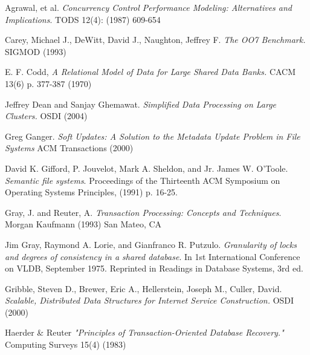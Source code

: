 \documentclass[10pt,letterpaper,twocolumn,english]{article}
\begin{document}
\begin{thebibliography}{99}
\begin{small}
 Agrawal, et al. {\em Concurrency
Control Performance Modeling: Alternatives and Implications}. TODS
12(4): (1987) 609-654



 Carey, Michael J., DeWitt, David J., Naughton, Jeffrey F. {\em The OO7 Benchmark.} SIGMOD (1993)

 E. F. Codd, {\em A Relational Model of Data for Large Shared Data Banks.} CACM 13(6) p. 377-387 (1970)

 Jeffrey Dean and Sanjay Ghemawat. {\em Simplified Data Processing on Large Clusters. } OSDI (2004)


 Greg Ganger.  {\em Soft Updates: A Solution to the Metadata Update Problem in File Systems } ACM Transactions (2000)

 David K. Gifford, P. Jouvelot, Mark A. Sheldon, and Jr. James W. O'Toole. {\em Semantic file systems}. Proceedings of the Thirteenth ACM Symposium on Operating Systems Principles, (1991) p. 16-25.

 Gray, J. and Reuter, A. {\em Transaction Processing: Concepts and Techniques}. Morgan Kaufmann (1993) San Mateo, CA

 Jim Gray, Raymond A. Lorie, and Gianfranco R. Putzulo. {\em Granularity of locks and degrees of consistency in a shared database}. In 1st International Conference on VLDB, September 1975. Reprinted in Readings in Database Systems, 3rd ed.

  Gribble, Steven D., Brewer, Eric A., Hellerstein, Joseph M., Culler, David.  {\em Scalable, Distributed Data Structures for Internet Service Construction. } OSDI (2000)

 Haerder \& Reuter {\em "Principles of Transaction-Oriented Database Recovery." } Computing Surveys 15(4) (1983) %


\end{small}
\end{thebibliography}
\end{document}
